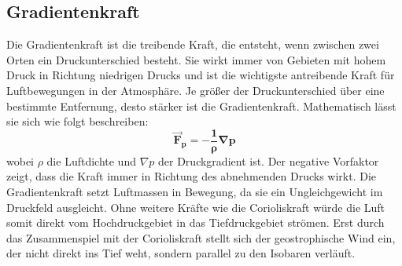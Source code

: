 \subsection{Gradientenkraft
\label{geostrophisch:subsection:gradient}}
Die Gradientenkraft ist die treibende Kraft, die entsteht, wenn zwischen zwei Orten ein Druckunterschied besteht. Sie wirkt immer von Gebieten mit hohem Druck in Richtung niedrigen Drucks und ist die wichtigste antreibende Kraft für Luftbewegungen in der Atmosphäre. Je größer der Druckunterschied über eine bestimmte Entfernung, desto stärker ist die Gradientenkraft.
Mathematisch lässt sie sich wie folgt beschreiben:
\begin{equation}
\boldsymbol{
\vec{F}_p 
= 
-\frac{1}{\rho} \nabla p
}
\label{geostrophisch:equation3}
\end{equation}
wobei $\rho$ die Luftdichte und $\nabla p$ der Druckgradient ist. 
Der negative Vorfaktor zeigt, dass die Kraft immer in Richtung des abnehmenden Drucks wirkt.
Die Gradientenkraft setzt Luftmassen in Bewegung, da sie ein Ungleichgewicht im Druckfeld ausgleicht. Ohne weitere Kräfte wie die Corioliskraft würde die Luft somit direkt vom Hochdruckgebiet in das Tiefdruckgebiet strömen. Erst durch das Zusammenspiel mit der Corioliskraft stellt sich der geostrophische Wind ein, der nicht direkt ins Tief weht, sondern parallel zu den Isobaren verläuft.



